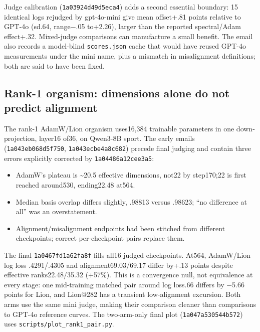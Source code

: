 \documentclass[
  british,
  10pt,
  a4paper,
]{article}
\providecommand{\tightlist}{%
  \setlength{\itemsep}{0pt}\setlength{\parskip}{0pt}}
\begin{document}
Judge calibration (\texttt{1a03924d49d5\allowbreak{}eca4}) adds a second
essential boundary: 15 identical logs rejudged by
gpt-\allowbreak{}4o-\allowbreak{}mini give mean offset+.81 points
relative to GPT-4o (sd.64, range−.05 to+2.26), larger than the reported
spectral/\allowbreak{}Adam effect+.\allowbreak{}32.\allowbreak{}
Mixed-\allowbreak{}judge comparisons can manufacture a small benefit.
The email also records a model-\allowbreak{}blind
\texttt{scores.\allowbreak{}json} cache that would have reused GPT-4o
measurements under the mini name, plus a mismatch in misalignment
definitions; both are said to have been fixed.

\subsection{Rank-1 organism: dimensions alone do not predict
alignment}\label{email-evidence--rank-1-organism-dimensions-alone-do-not-predict-alignment}

The rank-1 AdamW/Lion organism uses16,384 trainable parameters in one
down-\allowbreak{}projection,\allowbreak{} layer16 of36, on Qwen3-8B
sport. The early emails (\texttt{1a043eb068d5\allowbreak{}f750},
\texttt{1a043ecbe4a8\allowbreak{}c682}) precede final judging and
contain three errors explicitly corrected by
\texttt{1a04486a12ce\allowbreak{}e3a5}:

\begin{itemize}
\tightlist
\item
  AdamW's plateau is \textasciitilde20.5 effective
  dimensions,\allowbreak{} not22 by step170;22 is first reached
  around530, ending22.\allowbreak{}48 at564.
\item
  Median basis overlap differs slightly, .98813 versus .98623; ``no
  difference at all'' was an overstatemen\allowbreak{}t.\allowbreak{}
\item
  Alignment/\allowbreak{}misalignment\allowbreak{} endpoints had been
  stitched from different checkpoints; correct
  per-\allowbreak{}checkpoint pairs replace them.
\end{itemize}

The final \texttt{1a0467fd1a62\allowbreak{}fa8f} fills all16 judged
checkpoints.\allowbreak{} At564, AdamW/Lion log loss
.\allowbreak{}4291/\allowbreak{}.\allowbreak{}4305 and
alignment69.\allowbreak{}03/\allowbreak{}69.\allowbreak{}17 differ
by+.13 points despite effective
ranks22.\allowbreak{}48/\allowbreak{}35.\allowbreak{}32 (+57\%). This is
a convergence null, not equivalence at every stage: one
mid-\allowbreak{}training matched pair around log loss.66 differs by
−5.66 points for Lion, and Lion@282 has a transient
low-\allowbreak{}alignment excursion. Both arms use the same mini judge,
making their comparison cleaner than comparisons to GPT-4o reference
curves. The two-\allowbreak{}arm-\allowbreak{}only final plot
(\texttt{1a047a530544\allowbreak{}b572}) uses
\texttt{scripts/\allowbreak{}plot\_\allowbreak{}rank1\_\allowbreak{}pair.\allowbreak{}py}.
\end{document}
